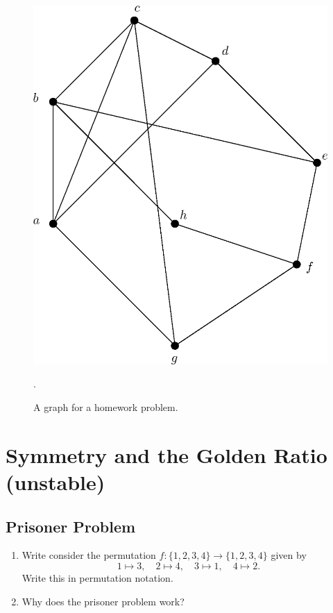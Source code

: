 \documentclass[11pt, letterpaper]{article}
\begin{document}
	
\begin{figure}[h]
	\begin{center}
		\includegraphics[scale=0.25]{non-planar.eps}
	\end{center}
	\caption{A graph for a homework problem. }\label{F:non-planar}.
\end{figure}

\newpage

\section{Symmetry and the Golden Ratio (unstable)}

\subsection{Prisoner Problem}
\begin{enumerate}
	\item Write consider the permutation $f: \lbrace 1,2,3,4\rbrace \to \lbrace 1,2,3,4\rbrace$ given by 
	 $$ 1 \mapsto 3,  \quad 2 \mapsto 4, \quad 3 \mapsto 1, \quad 4\mapsto 2.$$
	Write this in permutation notation.
	\item Why does the prisoner problem work?
\end{enumerate}
\end{document}
